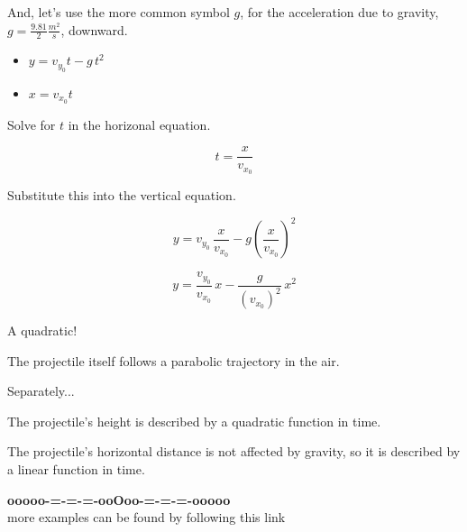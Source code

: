 \documentclass{ximera}
\begin{document}
And, let's use the more common symbol $g$, for the acceleration due to gravity, $g = \frac{9.81}{2} \frac{m^2}{s}$, downward.




\begin{itemize}
\item $y = v_{y_0} t - g \, t^2$


\item $x = v_{x_0} t$
\end{itemize}


Solve for $t$ in the horizonal equation.


\[ t = \frac{x}{v_{x_0}} \]

Substitute this into the vertical equation.


\[  y = v_{y_0} \, \frac{x}{v_{x_0}} - g \left(\frac{x}{v_{x_0}}\right)^2  \]



\[  y = \frac{v_{y_0}}{v_{x_0}} \, x  - \frac{g}{(v_{x_0})^2} \, x^2 \]



A quadratic! 

The projectile itself follows a parabolic trajectory in the air. 


Separately...


The projectile's height is described by a quadratic function in time. 


The projectile's horizontal distance is not affected by gravity, so it is described by a linear function in time. 












\begin{center}
\textbf{\textcolor{green!50!black}{ooooo-=-=-=-ooOoo-=-=-=-ooooo}} \\

more examples can be found by following this link\\ 

\end{center}
\end{document}
